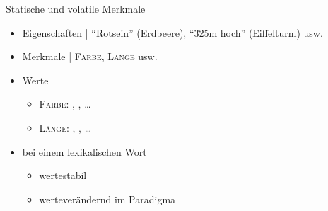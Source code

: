 \begin{frame}
  {Statische und volatile Merkmale}
  \pause
  \begin{itemize}[<+->]
    \item Eigenschaften | "`Rotsein"' (Erdbeere), "`325m hoch"' (Eiffelturm) usw.
    \item Merkmale | \alert{\textsc{Farbe}}, \alert{\textsc{Länge}} usw.
    \item Werte
      \begin{itemize}[<+->]
        \item \alert{\textsc{Farbe}}: , , \ldots
        \item \alert{\textsc{Länge}}: \rot{\textit{3cm}}, , \ldots
      \end{itemize}
  \end{itemize}
  \pause
  \Halbzeile 
  \begin{exe}
    \ex
    \begin{xlist}
      \pause
      \pause
    \end{xlist}
  \end{exe}
  \Halbzeile
  \pause
  \begin{itemize}[<+->]
    \item bei einem lexikalischen Wort
      \begin{itemize}
        \item {} wertestabil
        \item {} werteverändernd im Paradigma
      \end{itemize}
  \end{itemize}
\end{frame}

